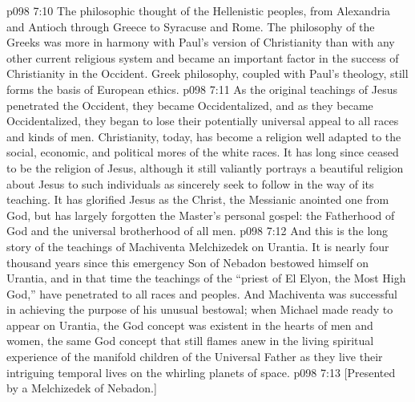\pc \vs p098 7:10 \bibnobreakspace The philosophic thought of the Hellenistic peoples, from Alexandria and Antioch through Greece to Syracuse and Rome. The philosophy of the Greeks was more in harmony with Paul’s version of Christianity than with any other current religious system and became an important factor in the success of Christianity in the Occident. Greek philosophy, coupled with Paul’s theology, still forms the basis of European ethics.
\pc \vs p098 7:11 As the original teachings of Jesus penetrated the Occident, they became Occidentalized, and as they became Occidentalized, they began to lose their potentially universal appeal to all races and kinds of men. Christianity, today, has become a religion well adapted to the social, economic, and political mores of the white races. It has long since ceased to be the religion of Jesus, although it still valiantly portrays a beautiful religion about Jesus to such individuals as sincerely seek to follow in the way of its teaching. It has glorified Jesus as the Christ, the Messianic anointed one from God, but has largely forgotten the Master’s personal gospel: the Fatherhood of God and the universal brotherhood of all men.
\pc \vs p098 7:12 And this is the long story of the teachings of Machiventa Melchizedek on Urantia. It is nearly four thousand years since this emergency Son of Nebadon bestowed himself on Urantia, and in that time the teachings of the “priest of El Elyon, the Most High God,” have penetrated to all races and peoples. And Machiventa was successful in achieving the purpose of his unusual bestowal; when Michael made ready to appear on Urantia, the God concept was existent in the hearts of men and women, the same God concept that still flames anew in the living spiritual experience of the manifold children of the Universal Father as they live their intriguing temporal lives on the whirling planets of space.
\vsetoff
\vs p098 7:13 [Presented by a Melchizedek of Nebadon.]

